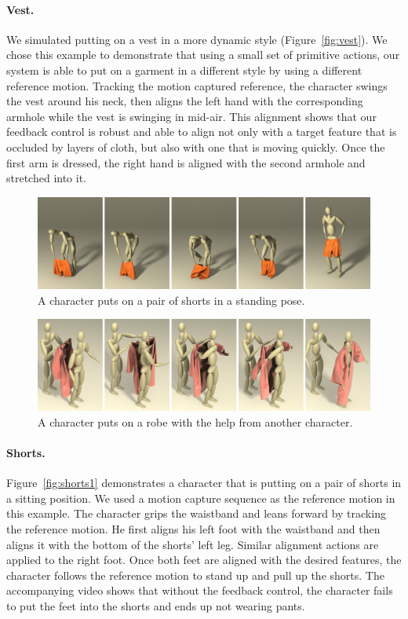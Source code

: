 \paragraph{Vest.} We simulated putting on a vest in a more dynamic style (Figure~\ref{fig:vest}). We chose this example to demonstrate that using a small set of primitive actions, our system is able to put on a garment in a different style by using a different reference motion. Tracking the motion captured reference, the character swings the vest around his neck, then aligns the left hand with the corresponding armhole while the vest is swinging in mid-air. This alignment shows that our feedback control is robust and able to align not only with a target feature that is occluded by layers of cloth, but also with one that is moving quickly. Once the first arm is dressed, the right hand is aligned with the second armhole and stretched into it. 

\begin{figure}[!t]
  \centering
  \includegraphics[width=\textwidth]{images/shortsStanding}
  \caption{A character puts on a pair of shorts in a standing pose.}
  \label{fig:shorts2}
\end{figure}

\begin{figure}[!t]
  \centering
  \includegraphics[width=\textwidth]{images/robe}
  \caption{A character puts on a robe with the help from another character.}
  \label{fig:robe}
\end{figure}

\paragraph{Shorts.} Figure~\ref{fig:shorts1} demonstrates a character that is putting on a pair of shorts in a sitting position. We used a motion capture sequence as the reference motion in this example. The character grips the waistband and leans forward by tracking the reference motion. He first aligns his left foot with the waistband and then aligns it with the bottom of the shorts' left leg. Similar alignment actions are applied to the right foot. Once both feet are aligned with the desired features, the character follows the reference motion to stand up and pull up the shorts. The accompanying video shows that without the feedback control, the character fails to put the feet into the shorts and ends up not wearing pants.

